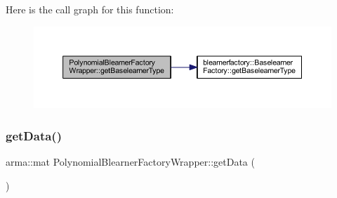 Here is the call graph for this function\+:\nopagebreak
\begin{figure}[H]
\begin{center}
\leavevmode
\includegraphics[width=350pt]{class_polynomial_blearner_factory_wrapper_afc3c4e2e5b3aa482cdb6e8fad0180442_cgraph}
\end{center}
\end{figure}
\mbox{\label{class_polynomial_blearner_factory_wrapper_a7949c6384e31e69033cfe0cd96ea9746}} 
\subsubsection{\texorpdfstring{get\+Data()}{getData()}}
{\footnotesize\ttfamily arma\+::mat Polynomial\+Blearner\+Factory\+Wrapper\+::get\+Data (\begin{DoxyParamCaption}{ }\end{DoxyParamCaption})\hspace{0.3cm}{\ttfamily [inline]}}

